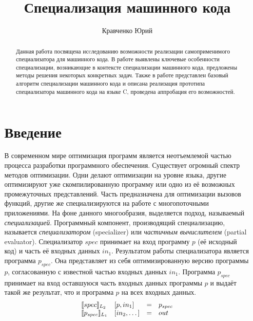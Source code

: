 \lstset{escapechar=@,style=mycode}


\title{Специализация машинного кода}


\author{Кравченко Юрий}



\maketitle

\begin{abstract}
Данная работа посвящена исcледованию возможности реализации самоприменимого специализатора для
машинного кода.
В работе выявлены ключевые особенности специализации, возникающие в контексте специализации машинного
кода, предложены методы решения некоторых конкретных задач.
Также в работе представлен базовый алгоритм специализации машинного кода и
описана реализация прототипа специализатора машинного кода на языке \textsf{C},
проведена аппробация его возможностей.
\end{abstract}


\section*{Введение}
В современном мире оптимизация программ является неотъемлемой частью процесса разработки программного обеспечения. Существует огромный спектр методов оптимизации.
Одни делают оптимизации на уровне языка, другие оптимизируют уже скомпилированную программу или одно из её возможных промежуточных
представлений.
Часть предназначена для оптимизации вызовов функций, другие же специализируются на работе с многопоточными приложениями.
На фоне данного многообразия, выделяется подход, называемый \emph{специализацией}.
Программный компонент, производящий специализацию, называется \emph{специализатором} (specializer) или
\emph{частичным вычислителем} (partial evaluator).
Специализатор $spec$ принимает на вход программу $p$ (её исходный код) и часть её входных данных $in_1$.
Результатом работы специализатора является программа $p_{spec}$.
Она представляет из себя оптимизированную версию программы $p$, согласованную с известной частью входных данных $in_1$.
Программа $p_{spec}$ принимает на вход оставшуюся часть входных данных программы $p$ и выдаёт такой же результат,
что и программа $p$ на всех входных данных. 
$$\begin{array}{l l c l}
    \llbracket spec \rrbracket_{L_2} & [p, in_1] &= &p_{spec}\\
    \llbracket p_{spec} \rrbracket_{L_1} & [in_2 ,\dots] &= &out
  \end{array}$$
      
